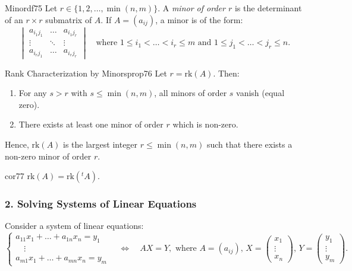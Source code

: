 \documentclass[11pt, a4paper]{article}
\begin{document}
\begin{definition}{Minor}{df75}
  Let $r \in \{1, 2, \dots, \min(n, m)\}$. A \emph{minor of order $r$} is the determinant of an $r \times r$ submatrix of $A$.
  If $A = (a_{ij})$, a minor is of the form:
  \[
    \begin{vmatrix}
      a_{i_1 j_1} & \dots & a_{i_1 j_r} \\
      \vdots & \ddots & \vdots \\
      a_{i_r j_1} & \dots & a_{i_r j_r}
    \end{vmatrix} \quad \text{where } 1 \le i_1 < \dots < i_r \le m \text{ and } 1 \le j_1 < \dots < j_r \le n.
  \]
\end{definition}

\begin{proposition}{Rank Characterization by Minors}{prop76}
  Let $r = \text{rk}(A)$. Then:
  \begin{enumerate}
    \item For any $s > r$ with $s \le \min(n, m)$, all minors of order $s$ vanish (equal zero).
    \item There exists at least one minor of order $r$ which is non-zero.
  \end{enumerate}
  Hence, $\text{rk}(A)$ is the largest integer $r \le \min(n, m)$ such that there exists a non-zero minor of order $r$.
\end{proposition}

\begin{corollary}{}{cor77}
  $\text{rk}(A) = \text{rk}({}^t A)$.
\end{corollary}

\subsubsection*{2. Solving Systems of Linear Equations}

Consider a system of linear equations:
\[
  \begin{cases}
    a_{11}x_1 + \dots + a_{1n}x_n = y_1 \\
    \quad \vdots \\
    a_{m1}x_1 + \dots + a_{mn}x_n = y_m
  \end{cases} \quad \iff \quad AX = Y, \text{ where } A = (a_{ij}), \, X = \begin{pmatrix} x_1 \\ \vdots \\ x_n \end{pmatrix}, \, Y = \begin{pmatrix} y_1 \\ \vdots \\ y_m \end{pmatrix}.
\]
\end{document}
